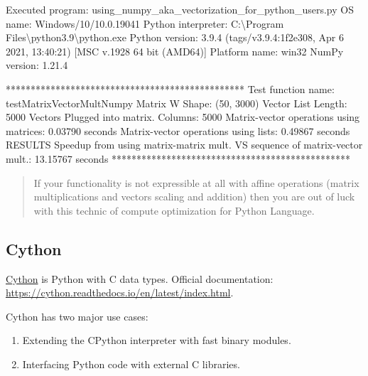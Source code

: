 \documentclass[
]{article}
\newenvironment{Shaded}{}{}
\newcommand{\NormalTok}[1]{#1}
\begin{document}
\begin{Shaded}
\begin{Highlighting}[]
\NormalTok{Executed program: using\_numpy\_aka\_vectorization\_for\_python\_users.py}
\NormalTok{OS name: Windows/10/10.0.19041}
\NormalTok{Python interpreter: C:\textbackslash{}Program Files\textbackslash{}python3.9\textbackslash{}python.exe}
\NormalTok{Python version: 3.9.4 (tags/v3.9.4:1f2e308, Apr  6 2021, 13:40:21) [MSC v.1928 64 bit (AMD64)]}
\NormalTok{Platform name: win32}
\NormalTok{NumPy version: 1.21.4}

\NormalTok{************************************************}
\NormalTok{Test function name:  testMatrixVectorMultNumpy}
\NormalTok{Matrix W Shape:  (50, 3000)}
\NormalTok{Vector List Length:  5000}
\NormalTok{Vectors Plugged into matrix. Columns:  5000}
\NormalTok{ Matrix{-}vector operations using matrices: 0.03790 seconds}
\NormalTok{ Matrix{-}vector operations using lists: 0.49867 seconds}
\NormalTok{RESULTS}
\NormalTok{ Speedup from using matrix{-}matrix mult. VS sequence of matrix{-}vector mult.: 13.15767 seconds}
\NormalTok{************************************************}
\end{Highlighting}
\end{Shaded}

\begin{quote}
If your functionality is not expressible at all with affine operations
(matrix multiplications and vectors scaling and addition) then you are
out of luck with this technic of compute optimization for Python
Language.
\end{quote}

\hypertarget{cython}{%
\subsection{Cython}\label{cython}}

\href{https://cython.readthedocs.io/en/latest/index.html}{Cython} is
Python with C data types. Official documentation:
\url{https://cython.readthedocs.io/en/latest/index.html}.

Cython has two major use cases:

\begin{enumerate}
\def\labelenumi{\arabic{enumi}.}
\item
  Extending the CPython interpreter with fast binary modules.
\item
  Interfacing Python code with external C libraries.
\end{enumerate}
\end{document}
